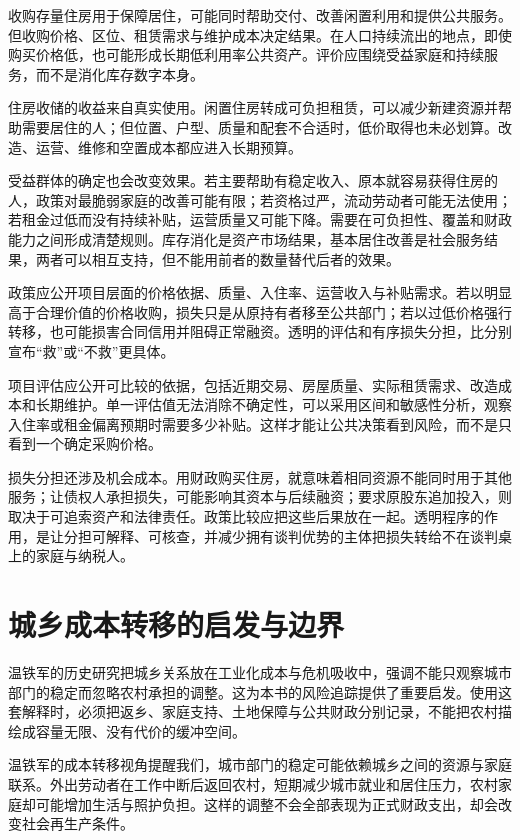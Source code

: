 \documentclass[UTF8,fontset=fandol,zihao=-4,oneside,openany]{ctexbook}
\begin{document}
收购存量住房用于保障居住，可能同时帮助交付、改善闲置利用和提供公共服务。但收购价格、区位、租赁需求与维护成本决定结果。在人口持续流出的地点，即使购买价格低，也可能形成长期低利用率公共资产。评价应围绕受益家庭和持续服务，而不是消化库存数字本身。

\label{arg:P131}
住房收储的收益来自真实使用。闲置住房转成可负担租赁，可以减少新建资源并帮助需要居住的人；但位置、户型、质量和配套不合适时，低价取得也未必划算。改造、运营、维修和空置成本都应进入长期预算。

受益群体的确定也会改变效果。若主要帮助有稳定收入、原本就容易获得住房的人，政策对最脆弱家庭的改善可能有限；若资格过严，流动劳动者可能无法使用；若租金过低而没有持续补贴，运营质量又可能下降。需要在可负担性、覆盖和财政能力之间形成清楚规则。库存消化是资产市场结果，基本居住改善是社会服务结果，两者可以相互支持，但不能用前者的数量替代后者的效果。

政策应公开项目层面的价格依据、质量、入住率、运营收入与补贴需求。若以明显高于合理价值的价格收购，损失只是从原持有者移至公共部门；若以过低价格强行转移，也可能损害合同信用并阻碍正常融资。透明的评估和有序损失分担，比分别宣布“救”或“不救”更具体。

\label{arg:P132}
项目评估应公开可比较的依据，包括近期交易、房屋质量、实际租赁需求、改造成本和长期维护。单一评估值无法消除不确定性，可以采用区间和敏感性分析，观察入住率或租金偏离预期时需要多少补贴。这样才能让公共决策看到风险，而不是只看到一个确定采购价格。

损失分担还涉及机会成本。用财政购买住房，就意味着相同资源不能同时用于其他服务；让债权人承担损失，可能影响其资本与后续融资；要求原股东追加投入，则取决于可追索资产和法律责任。政策比较应把这些后果放在一起。透明程序的作用，是让分担可解释、可核查，并减少拥有谈判优势的主体把损失转给不在谈判桌上的家庭与纳税人。

\section{城乡成本转移的启发与边界}
温铁军的历史研究把城乡关系放在工业化成本与危机吸收中，强调不能只观察城市部门的稳定而忽略农村承担的调整。这为本书的风险追踪提供了重要启发。使用这套解释时，必须把返乡、家庭支持、土地保障与公共财政分别记录，不能把农村描绘成容量无限、没有代价的缓冲空间。\cite{Wen2021}

\label{arg:P133}
温铁军的成本转移视角提醒我们，城市部门的稳定可能依赖城乡之间的资源与家庭联系。外出劳动者在工作中断后返回农村，短期减少城市就业和居住压力，农村家庭却可能增加生活与照护负担。这样的调整不会全部表现为正式财政支出，却会改变社会再生产条件。
\end{document}
